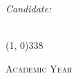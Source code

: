 \begin{titlepage}
\begin{center}
\begin{large}
\begin{flushright}
\textit{Candidate:}\\
\vspace{5pt}
\documentAuthor{} \\
\end{flushright}
\end{large}

\vspace{15pt}

\line(1, 0){338} \\
\begin{normalsize}
\textsc{Academic Year \myAA}
\end{normalsize}

\end{center}
\end{titlepage}
